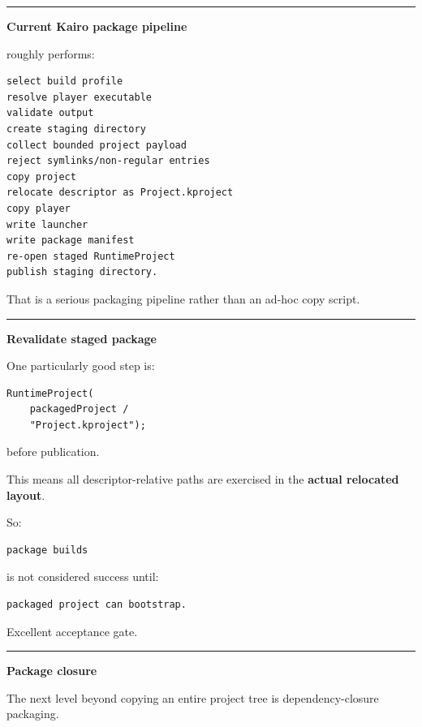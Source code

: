 \begin{center}\rule{0.5\linewidth}{0.5pt}\end{center}

\textbf{Current Kairo package pipeline}

 roughly performs:

\begin{verbatim}
select build profile
resolve player executable
validate output
create staging directory
collect bounded project payload
reject symlinks/non-regular entries
copy project
relocate descriptor as Project.kproject
copy player
write launcher
write package manifest
re-open staged RuntimeProject
publish staging directory.
\end{verbatim}

That is a serious packaging pipeline rather than an ad-hoc copy script.

\begin{center}\rule{0.5\linewidth}{0.5pt}\end{center}

\textbf{Revalidate staged package}

One particularly good step is:

\begin{verbatim}
RuntimeProject(
    packagedProject /
    "Project.kproject");
\end{verbatim}

before publication.

This means all descriptor-relative paths are exercised in the \textbf{actual relocated layout}.

So:

\begin{verbatim}
package builds
\end{verbatim}

is not considered success until:

\begin{verbatim}
packaged project can bootstrap.
\end{verbatim}

Excellent acceptance gate.

\begin{center}\rule{0.5\linewidth}{0.5pt}\end{center}

\textbf{Package closure}

The next level beyond copying an entire project tree is dependency-closure packaging.

